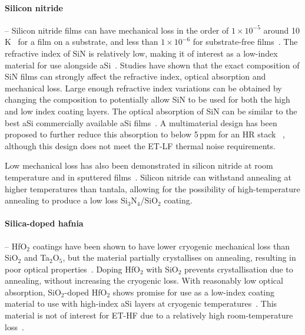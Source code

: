 \paragraph{Silicon nitride} -- Silicon nitride films can have mechanical loss in the order of $1\times10^{-5}$ around 10\,K~\cite{Liu_2007} for a film on a substrate, and less than $1\times10^{-6}$ for substrate-free films~\cite{Southworth2009}. The refractive index of SiN is relatively low, making it of interest as a low-index material for use alongside aSi~\cite{Pan2017,ionplating}. Studies have shown that the exact composition of SiN films can strongly affect the refractive index, optical absorption and mechanical loss. Large enough refractive index variations can be obtained by changing the composition to potentially allow SiN to be used for both the high and low index coating layers. The optical absorption of SiN can be similar to the best aSi commercially available aSi films~\cite{Pan2017,Steinlechner2017}. A multimaterial design has been proposed to further reduce this absorption to below 5\,ppm for an HR stack ~\cite{Pan_2018}, although this design does not meet the ET-LF thermal noise requirements. 

Low mechanical loss has also been demonstrated in silicon nitride at room temperature and in sputtered films~\cite{Amato_2018}. Silicon nitride can withstand annealing at higher temperatures than tantala,  allowing for the possibility of high-temperature annealing to produce a low loss Si$_3$N$_4$/SiO$_2$ coating.

\paragraph{Silica-doped hafnia} -- HfO$_2$ coatings have been shown to have lower cryogenic mechanical loss than SiO$_2$ and Ta$_2$O$_5$, but the material partially crystallises on annealing, resulting in poor optical properties~\cite{Abernathy_2011}. Doping HfO$_2$ with SiO$_2$ prevents crystallisation due to annealing, without increasing the cryogenic loss. With reasonably low optical absorption, SiO$_2$-doped HfO$_2$ shows promise for use as a low-index coating material to use with high-index aSi layers at cryogenic temperatures~\cite{Craig_2019}. This material is not of interest for ET-HF due to a relatively high room-temperature loss~\cite{CraigThesis}.

